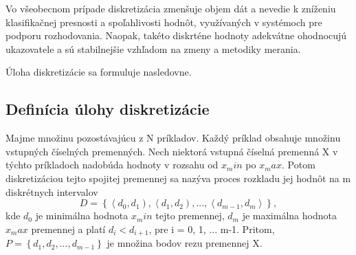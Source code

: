 Vo všeobecnom prípade diskretizácia zmenšuje objem dát a nevedie k zníženiu klasifikačnej presnosti a spoľahlivosti hodnôt, využívaných v systémoch pre podporu rozhodovania. Naopak, takéto diskrténe hodnoty adekvátne ohodnocujú ukazovatele a sú stabilnejšie vzhľadom na zmeny a metodiky merania. 
\cite{levashenkoProj, Lui2002}

Úloha diskretizácie sa formuluje nasledovne. 
\subsection{Definícia úlohy diskretizácie}
Majme množinu pozostávajúcu z N príkladov. Každý príklad obsahuje množinu vstupných číselných premenných. Nech niektorá vstupná číselná premenná X v týchto príkladoch nadobúda hodnoty v rozsahu od $x_min$ po $x_max$. Potom diskretizáciou tejto spojitej premennej sa nazýva proces rozkladu jej hodnôt na m diskrétnych intervalov
\begin{equation}\label{dkiskr}
D =\left\lbrace
\left\langle d_0, d_1 \right) , 
\left\langle d_1, d_2 \right) , ... , 
\left\langle d_{m-1}, d_m \right\rangle 
 \right\rbrace, 
\end{equation} 
kde $d_0$ je minimálna hodnota $x_min$ tejto premennej, $d_m$ je maximálna hodnota $x_max$ premennej a platí $d_i < d_{i+1}$, pre i = 0, 1, ... m-1. 
Pritom, $P = \left\lbrace d_1, d_2, ..., d_{m-1} \right\rbrace$ je množina bodov rezu premennej X.    \cite{levashenkoProj, Garcia2013}


